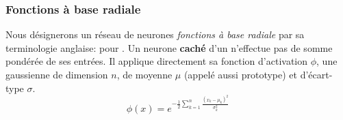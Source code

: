 \subsubsection{Fonctions à base radiale}
Nous désignerons un réseau de neurones \emph{fonctions à base radiale} par sa terminologie anglaise: \rbf pour .
\newcommand{\factnorm}{\sum_{r=1}^{m}x_{r}}
Un neurone \textbf{caché} d'un \rbf n'effectue pas de somme pondérée de ses entrées.
Il applique directement sa fonction d'activation $\phi$, une gaussienne de dimension $n$, de moyenne $\mu$ (appelé aussi prototype) et d'écart-type $\sigma$.
\begin{equation}\label{eq:cachephi}
 \phi(x) = e^{-\frac{1}{2}\sum_{k=1}^{n}\frac{(x_k-\mu_{k})^2}{\sigma_{k}^{2}}}
\end{equation}

